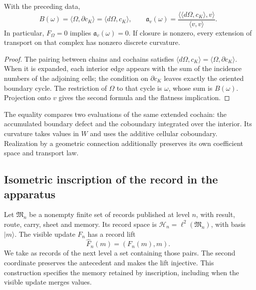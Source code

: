 \begin{theorem}
\label{vii:vii:thm:observador-stokes}
With the preceding data,
\begin{equation}
 B(\omega)=\langle\Omega,\partial c_K\rangle
          =\langle d\Omega,c_K\rangle,
 \qquad
 \mathfrak a_v(\omega)
 =\frac{\langle\langle d\Omega,c_K\rangle,v\rangle}
        {\langle v,v\rangle}.
 \label{vii:vii:eq:observador-stokes}
\end{equation}
In particular, \(F_\Omega=0\) implies \(\mathfrak a_v(\omega)=0\).
If closure is nonzero, every extension of transport on that complex
has nonzero discrete curvature.
\end{theorem}

\begin{proof}
The pairing between chains and cochains satisfies
\(\langle d\Omega,c_K\rangle=\langle\Omega,\partial c_K\rangle\).
When it is expanded, each interior edge appears with the sum of the incidence
numbers of the adjoining cells; the condition on
\(\partial c_K\) leaves exactly the oriented boundary cycle.
The restriction of \(\Omega\) to that cycle is \(\omega\), whose sum
is \(B(\omega)\). Projection onto \(v\) gives the second formula
and the flatness implication.
\end{proof}

The equality compares two evaluations of the same extended cochain:
the accumulated boundary defect and the coboundary integrated over the interior.
Its curvature takes values in \(W\) and uses the additive cellular coboundary.
Realization by a geometric connection additionally preserves
its own coefficient space and transport law.

\subsection{Isometric inscription of the record in the apparatus}
\label{vii:vii:sec:observador-aparato}

Let \(\mathfrak M_n\) be a nonempty finite set of records
published at level \(n\), with result, route, carry, sheet and memory.
Its record space is
\(\mathcal H_n=\ell^2(\mathfrak M_n)\), with basis \(|m\rangle\).
The visible update \(F_n\) has a record lift
\[
 \widehat F_n(m)=(F_n(m),m).
\]
We take as records of the next level a set containing those
pairs. The second coordinate preserves the antecedent and makes the lift
injective. This construction specifies the memory retained by
inscription, including when the visible update merges values.

